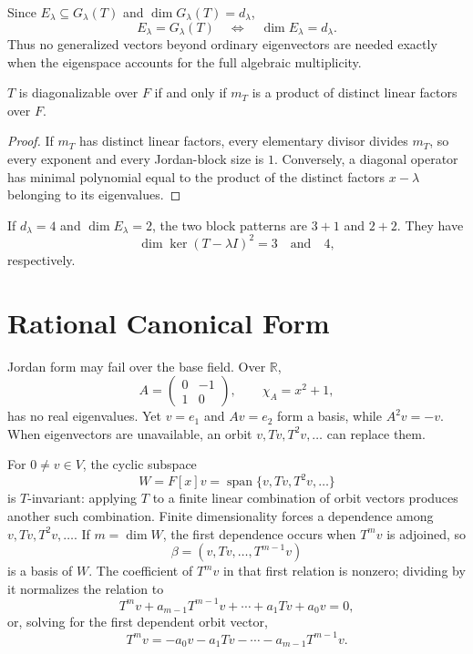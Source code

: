 Since \(E_\lambda\subseteq G_\lambda(T)\) and
\(\dim G_\lambda(T)=d_\lambda\),
\[
E_\lambda=G_\lambda(T)\quad\Longleftrightarrow\quad
\dim E_\lambda=d_\lambda.
\]
Thus no generalized vectors beyond ordinary eigenvectors are needed exactly
when the eigenspace accounts for the full algebraic multiplicity.

\begin{corollary}
\label{cor:diagonalizable-minimal-polynomial}
\(T\) is diagonalizable over \(F\) if and only if \(m_T\) is a product of
distinct linear factors over \(F\).
\end{corollary}
\begin{proof}
If \(m_T\) has distinct linear factors, every elementary divisor divides
\(m_T\), so every exponent and every Jordan-block size is \(1\). Conversely,
a diagonal operator has minimal polynomial equal to the product of the
distinct factors \(x-\lambda\) belonging to its eigenvalues.
\end{proof}

\begin{example}
If \(d_\lambda=4\) and \(\dim E_\lambda=2\), the two block patterns are
\(3+1\) and \(2+2\). They have
\[
\dim\ker(T-\lambda I)^2=3\quad\text{and}\quad4,
\]
respectively.
\end{example}

\section{Rational Canonical Form}\label{sec:rational-canonical-form}
Jordan form may fail over the base field. Over \(\mathbb R\),
\[
A=\begin{pmatrix}0&-1\\1&0\end{pmatrix},\qquad \chi_A=x^2+1,
\]
has no real eigenvalues. Yet \(v=e_1\) and \(Av=e_2\) form a basis, while
\(A^2v=-v\). When eigenvectors are unavailable, an orbit
\(v,Tv,T^2v,\ldots\) can replace them.

For \(0\ne v\in V\), the cyclic subspace
\[
W=F[x]v=\operatorname{span}\{v,Tv,T^2v,\ldots\}
\]
is \(T\)-invariant: applying \(T\) to a finite linear combination of orbit
vectors produces another such combination. Finite dimensionality forces a
dependence among \(v,Tv,T^2v,\ldots\). If \(m=\dim W\), the first dependence
occurs when \(T^mv\) is adjoined, so
\[
\beta=(v,Tv,\ldots,T^{m-1}v)
\]
is a basis of \(W\). The coefficient of \(T^mv\) in that first relation is
nonzero; dividing by it normalizes the relation to
\[
T^mv+a_{m-1}T^{m-1}v+\cdots+a_1Tv+a_0v=0,
\]
or, solving for the first dependent orbit vector,
\[
T^mv=-a_0v-a_1Tv-\cdots-a_{m-1}T^{m-1}v.
\]

